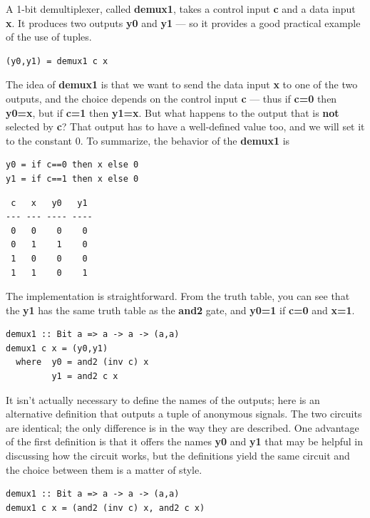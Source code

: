 \documentclass[]{svmono}
\begin{document}
A 1-bit demultiplexer, called \textbf{demux1}, takes a control input \textbf{c} and
a data input \textbf{x}.  It produces two outputs \textbf{y0} and \textbf{y1} --- so it
provides a good practical example of the use of tuples.


\begin{verbatim}
(y0,y1) = demux1 c x
\end{verbatim}


The idea of \textbf{demux1} is that we want to send the data input \textbf{x} to one
of the two outputs, and the choice depends on the control input \textbf{c}
--- thus if \textbf{c=0} then \textbf{y0=x}, but if \textbf{c=1} then \textbf{y1=x}.
But what happens to the output that is \textbf{not} selected by \textbf{c}?
That output has to have a well-defined value too, and we will set it
to the constant 0.  To summarize, the behavior of the \textbf{demux1} is


\begin{verbatim}
y0 = if c==0 then x else 0
y1 = if c==1 then x else 0
\end{verbatim}


\begin{verbatim}
 c   x   y0   y1
--- --- ---- ----
 0   0    0    0
 0   1    1    0
 1   0    0    0
 1   1    0    1
\end{verbatim}

The implementation is straightforward.  From the truth table, you can
see that the \textbf{y1} has the same truth table as the \textbf{and2} gate, and
\textbf{y0=1} if \textbf{c=0} and \textbf{x=1}.


\begin{verbatim}
demux1 :: Bit a => a -> a -> (a,a)
demux1 c x = (y0,y1)
  where  y0 = and2 (inv c) x
         y1 = and2 c x
\end{verbatim}


It isn't actually necessary to define the names of the outputs; here
is an alternative definition that outputs a tuple of anonymous
signals.  The two circuits are identical; the only difference is in
the way they are described.  One advantage of the first definition is
that it offers the names \textbf{y0} and \textbf{y1} that may be helpful in
discussing how the circuit works, but the definitions yield the same
circuit and the choice between them is a matter of style.


\begin{verbatim}
demux1 :: Bit a => a -> a -> (a,a)
demux1 c x = (and2 (inv c) x, and2 c x)
\end{verbatim}
\end{document}
